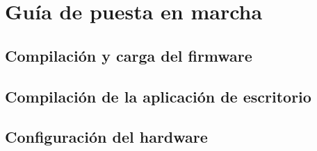 
\setcounter{figure}{0}
\section{Guía de puesta en marcha}
\subsection{Compilación y carga del firmware}
\subsection{Compilación de la aplicación de escritorio}
\subsection{Configuración del hardware}